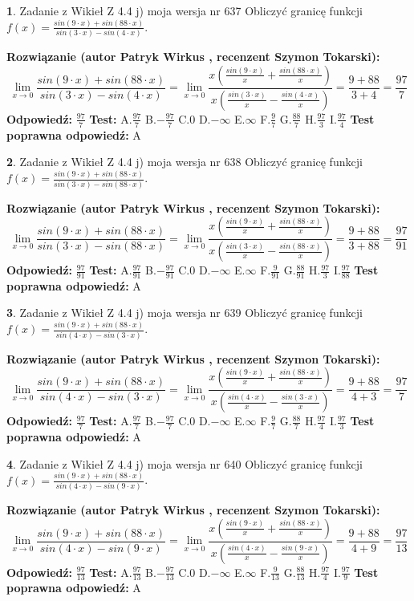 \documentclass[12pt, a4paper]{article}
\theoremstyle{definition} %
\newtheorem{zad}{}
\newcommand{\zadStart}[1]{\begin{zad}#1\newline}
\newcommand{\zadStop}{\end{zad}}
\newcommand{\rozwStart}[2]{\noindent \textbf{Rozwiązanie (autor #1 , recenzent #2): }\newline}
\newcommand{\rozwStop}{\newline}
\newcommand{\odpStart}{\noindent \textbf{Odpowiedź:}\newline}
\newcommand{\odpStop}{\newline}
\newcommand{\testStart}{\noindent \textbf{Test:}\newline}
\newcommand{\testStop}{\newline}
\newcommand{\kluczStart}{\noindent \textbf{Test poprawna odpowiedź:}\newline}
\newcommand{\kluczStop}{\newline}
\begin{document}
\zadStart{Zadanie z Wikieł Z 4.4 j) moja wersja nr 637}
Obliczyć granicę funkcji $f(x)=\frac{sin(9\cdot x) +sin(88\cdot x)}{sin(3\cdot x) -sin(4\cdot x)}$.
\zadStop
\rozwStart{Patryk Wirkus}{Szymon Tokarski}
$$\lim\limits_{x\to 0}\frac{sin(9\cdot x) +sin(88\cdot x)}{sin(3\cdot x) -sin(4\cdot x)}=\lim\limits_{x\to 0}\frac{x(\frac{sin(9\cdot x)}{x}+\frac{sin(88\cdot x)}{x})}{x(\frac{sin(3\cdot x)}{x}-\frac{sin(4\cdot x)}{x})}=\frac{9+88}{3+4} = \frac{97}{7}$$
\rozwStop
\odpStart
$\frac{97}{7}$
\odpStop
\testStart
A.$\frac{97}{7}$
B.$-\frac{97}{7}$
C.$0$
D.$-\infty$
E.$\infty$
F.$\frac{9}{7}$
G.$\frac{88}{7}$
H.$\frac{97}{3}$
I.$\frac{97}{4}$
\testStop
\kluczStart
A
\kluczStop



\zadStart{Zadanie z Wikieł Z 4.4 j) moja wersja nr 638}
Obliczyć granicę funkcji $f(x)=\frac{sin(9\cdot x) +sin(88\cdot x)}{sin(3\cdot x) -sin(88\cdot x)}$.
\zadStop
\rozwStart{Patryk Wirkus}{Szymon Tokarski}
$$\lim\limits_{x\to 0}\frac{sin(9\cdot x) +sin(88\cdot x)}{sin(3\cdot x) -sin(88\cdot x)}=\lim\limits_{x\to 0}\frac{x(\frac{sin(9\cdot x)}{x}+\frac{sin(88\cdot x)}{x})}{x(\frac{sin(3\cdot x)}{x}-\frac{sin(88\cdot x)}{x})}=\frac{9+88}{3+88} = \frac{97}{91}$$
\rozwStop
\odpStart
$\frac{97}{91}$
\odpStop
\testStart
A.$\frac{97}{91}$
B.$-\frac{97}{91}$
C.$0$
D.$-\infty$
E.$\infty$
F.$\frac{9}{91}$
G.$\frac{88}{91}$
H.$\frac{97}{3}$
I.$\frac{97}{88}$
\testStop
\kluczStart
A
\kluczStop



\zadStart{Zadanie z Wikieł Z 4.4 j) moja wersja nr 639}
Obliczyć granicę funkcji $f(x)=\frac{sin(9\cdot x) +sin(88\cdot x)}{sin(4\cdot x) -sin(3\cdot x)}$.
\zadStop
\rozwStart{Patryk Wirkus}{Szymon Tokarski}
$$\lim\limits_{x\to 0}\frac{sin(9\cdot x) +sin(88\cdot x)}{sin(4\cdot x) -sin(3\cdot x)}=\lim\limits_{x\to 0}\frac{x(\frac{sin(9\cdot x)}{x}+\frac{sin(88\cdot x)}{x})}{x(\frac{sin(4\cdot x)}{x}-\frac{sin(3\cdot x)}{x})}=\frac{9+88}{4+3} = \frac{97}{7}$$
\rozwStop
\odpStart
$\frac{97}{7}$
\odpStop
\testStart
A.$\frac{97}{7}$
B.$-\frac{97}{7}$
C.$0$
D.$-\infty$
E.$\infty$
F.$\frac{9}{7}$
G.$\frac{88}{7}$
H.$\frac{97}{4}$
I.$\frac{97}{3}$
\testStop
\kluczStart
A
\kluczStop



\zadStart{Zadanie z Wikieł Z 4.4 j) moja wersja nr 640}
Obliczyć granicę funkcji $f(x)=\frac{sin(9\cdot x) +sin(88\cdot x)}{sin(4\cdot x) -sin(9\cdot x)}$.
\zadStop
\rozwStart{Patryk Wirkus}{Szymon Tokarski}
$$\lim\limits_{x\to 0}\frac{sin(9\cdot x) +sin(88\cdot x)}{sin(4\cdot x) -sin(9\cdot x)}=\lim\limits_{x\to 0}\frac{x(\frac{sin(9\cdot x)}{x}+\frac{sin(88\cdot x)}{x})}{x(\frac{sin(4\cdot x)}{x}-\frac{sin(9\cdot x)}{x})}=\frac{9+88}{4+9} = \frac{97}{13}$$
\rozwStop
\odpStart
$\frac{97}{13}$
\odpStop
\testStart
A.$\frac{97}{13}$
B.$-\frac{97}{13}$
C.$0$
D.$-\infty$
E.$\infty$
F.$\frac{9}{13}$
G.$\frac{88}{13}$
H.$\frac{97}{4}$
I.$\frac{97}{9}$
\testStop
\kluczStart
A
\kluczStop
\end{document}
